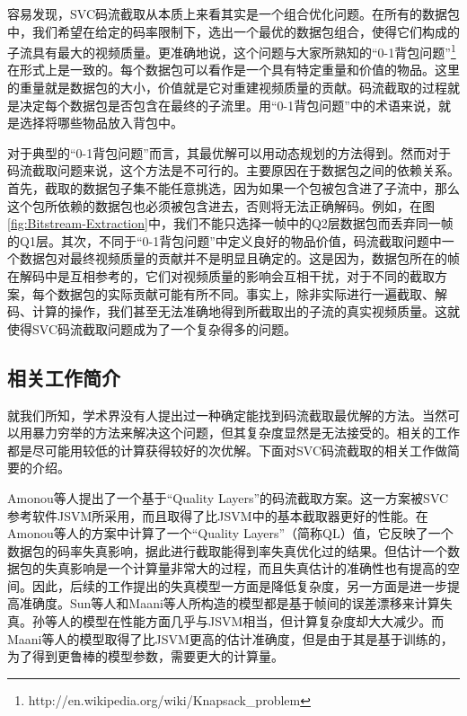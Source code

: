 容易发现，SVC码流截取从本质上来看其实是一个组合优化问题。在所有的数据包中，我们希望在给定的码率限制下，选出一个最优的数据包组合，使得它们构成的子流具有最大的视频质量。更准确地说，这个问题与大家所熟知的“0-1背包问题”\footnote{http://en.wikipedia.org/wiki/Knapsack\_problem}在形式上是一致的。每个数据包可以看作是一个具有特定重量和价值的物品。这里的重量就是数据包的大小，价值就是它对重建视频质量的贡献。码流截取的过程就是决定每个数据包是否包含在最终的子流里。用“0-1背包问题”中的术语来说，就是选择将哪些物品放入背包中。

对于典型的“0-1背包问题”而言，其最优解可以用动态规划的方法得到。然而对于码流截取问题来说，这个方法是不可行的。主要原因在于数据包之间的依赖关系。首先，截取的数据包子集不能任意挑选，因为如果一个包被包含进了子流中，那么这个包所依赖的数据包也必须被包含进去，否则将无法正确解码。例如，在图\ref{fig:Bitstream-Extraction}中，我们不能只选择一帧中的Q2层数据包而丢弃同一帧的Q1层。其次，不同于“0-1背包问题”中定义良好的物品价值，码流截取问题中一个数据包对最终视频质量的贡献并不是明显且确定的。这是因为，数据包所在的帧在解码中是互相参考的，它们对视频质量的影响会互相干扰，对于不同的截取方案，每个数据包的实际贡献可能有所不同。事实上，除非实际进行一遍截取、解码、计算的操作，我们甚至无法准确地得到所截取出的子流的真实视频质量。这就使得SVC码流截取问题成为了一个复杂得多的问题。

\subsection{相关工作简介}

就我们所知，学术界没有人提出过一种确定能找到码流截取最优解的方法。当然可以用暴力穷举的方法来解决这个问题，但其复杂度显然是无法接受的。相关的工作都是尽可能用较低的计算获得较好的次优解。下面对SVC码流截取的相关工作做简要的介绍。

Amonou等人\supercite{Amonou2007}提出了一个基于“Quality Layers”的码流截取方案。这一方案被SVC参考软件JSVM\supercite{JSVM}所采用，而且取得了比JSVM中的基本截取器更好的性能。在Amonou等人的方案中计算了一个“Quality Layers”（简称QL）值，它反映了一个数据包的码率失真影响，据此进行截取能得到率失真优化过的结果。但估计一个数据包的失真影响是一个计算量非常大的过程，而且失真估计的准确性也有提高的空间。因此，后续的工作提出的失真模型一方面是降低复杂度，另一方面是进一步提高准确度。Sun等人\supercite{Sun2009}和Maani等人\supercite{Maani2009}所构造的模型都是基于帧间的误差漂移来计算失真。孙等人的模型在性能方面几乎与JSVM相当，但计算复杂度却大大减少。而Maani等人的模型取得了比JSVM更高的估计准确度，但是由于其是基于训练的，为了得到更鲁棒的模型参数，需要更大的计算量。

